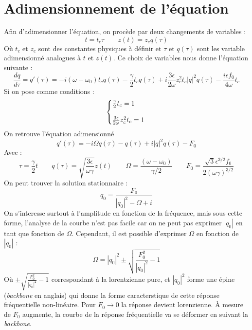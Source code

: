 \section{Adimensionnement de l'équation}
%
Afin d'adimensionner l'équation, on procède par deux changements de variables :
%
\begin{equation}
    t = t_c \tau
    \qquad 
    z(t) = z_c q(\tau)
\end{equation}
Où $t_c$ et $z_c$ sont des constantes physiques à définir et $\tau$ et $q(\tau)$ sont les variable adimensionné analogues à $t$ et $z(t)$.
Ce choix de variables nous donne l'équation suivante :
%
\begin{equation}
    \frac{dq}{d\tau} = q'(\tau) = -i(\omega - \omega_0)t_c q(\tau) - \frac{\gamma}{2}t_c q(\tau) + i \frac{3\epsilon}{2\omega}z_c^2t_c |q|^2q(\tau) - \frac{i\epsilon f_0}{4\omega}t_c
\end{equation}
%
Si on pose comme conditions :
%
\begin{equation}
    \left\{
    \begin{array}{@{}l@{}}
        \frac{\gamma}{2}t_c = 1 \\
        \\
        \frac{3\epsilon}{2\omega}z_c^2t_c = 1
    \end{array}
    \right.\,
\end{equation}
%
On retrouve l'équation adimensionné
%
\begin{equation}
    q'(\tau) = -i\Omega q(\tau) - q(\tau) + i|q|^2q(\tau) - F_0
\end{equation}
%
Avec :
%
\begin{equation}
    \tau = \frac{\gamma}{2}t
    \qquad
    q(\tau) = \sqrt{\frac{3\epsilon}{\omega\gamma}}z(t)
    \qquad
    \Omega = \frac{(\omega - \omega_0)}{\gamma/2}
    \qquad
    F_0 = \frac{\sqrt{3}\epsilon^{3/2} f_0}{2(\omega \gamma)^{3/2}}
\end{equation}
%
On peut trouver la solution stationnaire :
%
\begin{equation}
    q_0 = \frac{F_0}{|q_0|^2 - \Omega + i}
    \label{eq:duff_stationnaire}
\end{equation}
%
On s'interesse surtout à l'amplitude en fonction de la fréquence, 
mais sous cette forme, l'analyse de la courbe n'est pas facile car 
on ne peut pas exprimer $|q_0|$ en tant que fonction de $\Omega$. 
Cependant, il est possible d'exprimer $\Omega$ en fonction de $|q_0|$ :
%
\begin{equation}
    \Omega = |q_0|^2 \pm \sqrt{\frac{F_0^2}{|q_0|^2} - 1 }
\end{equation}
%
Où $\pm \sqrt{\frac{F_0^2}{|q_0|^2} - 1 }$ correspondant à la lorentzienne pure, et $|q_0|^2$ forme 
une épine (\emph{backbone} en anglais) qui donne la forme caracterstique de cette réponse fréquentielle non-linéaire.
%
Pour $F_0 \to 0$ la réponse devient lorenzienne. À mesure de $F_0$ augmente, la courbe de la réponse fréquentielle va se déformer en suivant la \emph{backbone}.

